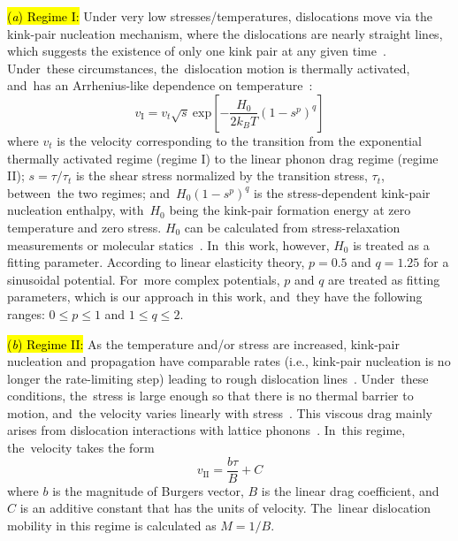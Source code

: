 \documentclass[applsci,article,accept,pdftex,moreauthors]{Definitions/mdpi}
\newcommand{\?}{\stackrel{?}{=}}
\begin{document}
\hl{(\textit{a}) Regime I:} %
 Under very low stresses/temperatures, dislocations move via the kink-pair nucleation mechanism, where the dislocations are nearly straight lines, which suggests the existence of only one kink pair at any given time~\cite{Gilbert2011}. Under~these circumstances, the~dislocation motion is thermally activated, and~has an Arrhenius-like dependence on temperature~\cite{Gilbert2011, Starikov2020}:
\begin{equation}
v_\text{I} = v_t \sqrt{s} \ \mathrm{exp} \left[ - \frac{H_0}{2 k_B T} \left(1-s^p\right)^q \right]
\label{Eq:MobI}
\end{equation}
where $v_t$ is the velocity corresponding to the transition from the exponential thermally activated regime (regime I) to the linear phonon drag regime (regime II); $s = \tau/\tau_t$ is the shear stress normalized by the transition stress, $\tau_t$, between~the two regimes; and~$H_0 \left(1-s^p\right)^q$ is the stress-dependent kink-pair nucleation enthalpy, with~$H_0$ being the kink-pair formation energy at zero temperature and zero stress. $H_0$ can be calculated from stress-relaxation measurements or molecular statics~\cite{Ventelon2009, Gilbert2011}. In~this work, however, $H_0$ is treated as a fitting parameter. According to linear elasticity theory, $p=0.5$ and $q=1.25$ for a sinusoidal potential. For~more complex potentials, $p$ and $q$ are treated as fitting parameters, which is our approach in this work, and~they have the following ranges: $0 \leq p \leq 1$ and $1 \leq q \leq 2$.

\hl{(\textit{b}) Regime II:} As the temperature and/or stress are increased, kink-pair nucleation and propagation have comparable rates (i.e., kink-pair nucleation is no longer the rate-limiting step) leading to rough dislocation lines~\cite{Gilbert2011}. Under~these conditions, the~stress is large enough so that there is no thermal barrier to motion, and~the velocity varies linearly with stress~\cite{Dang2019, Olmsted2005}. This viscous drag mainly arises from dislocation interactions with lattice phonons~\cite{Dang2019}. In~this regime, the~velocity takes the form
\begin{equation}
v_\text{II} = \frac{b \tau}{B} + C
\label{Eq:MobII}
\end{equation}
where $b$ is the magnitude of Burgers vector, $B$ is the linear drag coefficient, and~$C$ is an additive constant that has the units of velocity. The~linear dislocation mobility in this regime is calculated as $M = 1/B$.
\end{document}
